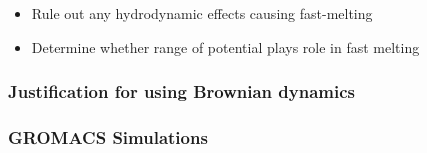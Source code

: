 \documentclass[11pt]{article}
\begin{document}
\begin{itemize}

\item Rule out any hydrodynamic effects causing fast-melting\\
\label{sec-2.3.1.1}


\item Determine whether range of potential plays role in fast melting\\
\label{sec-2.3.1.2}

\end{itemize} %
\subsubsection{Justification for using Brownian dynamics}
\label{sec-2.3.2}

\subsubsection{GROMACS Simulations}
\label{sec-2.3.3}
\end{document}
